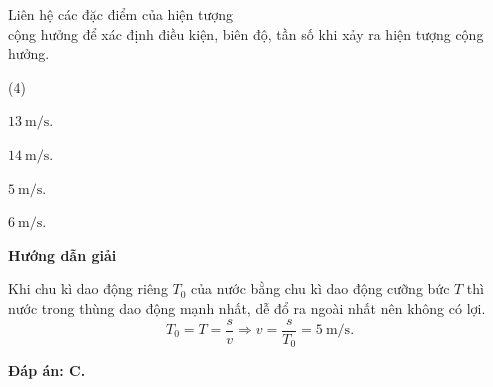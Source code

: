 \begin{dang}{Liên hệ các đặc điểm của hiện tượng\\ cộng hưởng để xác định điều kiện, biên độ, tần số khi xảy ra hiện tượng cộng hưởng.}
{		\begin{mcq}(4)
			\item $\SI{13}{\meter / \second}$.
			\item $\SI{14}{\meter / \second}$.
			\item $\SI{5}{\meter / \second}$.
			\item $\SI{6}{\meter / \second}$.
		\end{mcq}
	}
	{\begin{center}
			\textbf{Hướng dẫn giải}
		\end{center}
		Khi chu kì dao động riêng $T_0$ của nước bằng chu kì dao động cưỡng bức $T$ thì nước trong thùng dao động mạnh nhất, dễ đổ ra ngoài nhất nên không có lợi.
		\begin{equation*}
			T_0=T=\dfrac{s}{v}\Rightarrow v=\dfrac{s}{T_0}=\SI{5}{\meter / \second}.
		\end{equation*}
		
		\textbf{Đáp án: C.}
	}
	
\end{dang}
